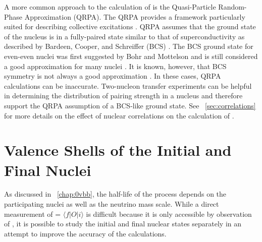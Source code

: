 A more common approach to the calculation of \NME is the Quasi-Particle Random-Phase Approximation (QRPA).  The QRPA provides a framework particularly suited for describing collective excitations \citep{Casten}.  QRPA assumes that the ground state of the nucleus is in a fully-paired state \citep{BenderSCMF} similar to that of superconductivity as described by Bardeen, Cooper, and Schreiffer (BCS) \citep{BCS}.  The BCS ground state for even-even nuclei was first suggested by Bohr and Mottelson \citep{nucleiBCS} and is still considered a good approximation for many nuclei \citep{validRegionsBCS_highMass}.  It is known, however, that BCS symmetry is not always a good approximation \citep{NambuBCS}.  In these cases, QRPA calculations can be inaccurate.  Two-nucleon transfer experiments can be helpful in determining the distribution of pairing strength in a nucleus \citep{Yoshida} and therefore support the QRPA assumption of a BCS-like ground state.  See {\sect}~\ref{sec:correlations} for more details on the effect of nuclear correlations on the calculation of \NME. 

\section{Valence Shells of the Initial and Final Nuclei}
\label{sec:valence}

As discussed in {\chap}~\ref{chap:0vbb}, the half-life of the \zvbb process depends on the participating nuclei as well as the neutrino mass scale.  While a direct measurement of \NME = $\langle f|O|i \rangle$ is difficult because it is only accessible by observation of \zvbb, it is possible to study the initial and final nuclear states separately in an attempt to improve the accuracy of the calculations.  

